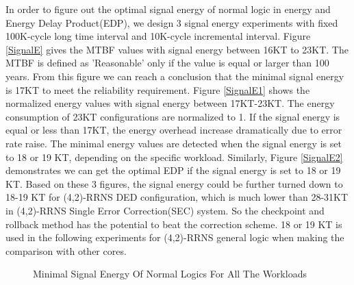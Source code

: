 \documentclass{sig-alternate}
\begin{document}
In order to figure out the optimal signal energy of normal logic in energy and Energy Delay Product(EDP), we design 3 signal energy experiments with fixed 100K-cycle long time interval and 10K-cycle incremental interval.  Figure \ref{SignalE} gives the MTBF values with signal energy between 16KT to 23KT. The MTBF is defined as 'Reasonable' only if the value is equal or larger than 100 years. From this figure we can reach a conclusion that the minimal signal energy is 17KT to meet the reliability requirement. Figure \ref{SignalE1} shows the normalized energy values with signal energy between 17KT-23KT. The energy consumption of 23KT configurations are normalized to 1. If the signal energy is equal or less than 17KT, the energy overhead increase dramatically due to error rate raise. The minimal energy values are detected when the signal energy is set to 18 or 19 KT, depending on the specific workload. Similarly,  Figure \ref{SignalE2} demonstrates we can get the optimal EDP if the signal energy is set to 18 or 19 KT. Based on these 3 figures, the signal energy could be further turned down to 18-19 KT for (4,2)-RRNS DED configuration, which is much lower than 28-31KT in (4,2)-RRNS Single Error Correction(SEC) system. So the checkpoint and rollback method has the potential to beat the correction scheme. 18 or 19 KT is used in the following experiments for (4,2)-RRNS general logic when making the comparison with other cores. 

\begin{figure}[!t]
\centering
{}
\hfil
{}
\hfil
{}
\caption{Minimal Signal Energy Of Normal Logics For All The Workloads}
\label{fig_sim}
\end{figure}
\end{document}
